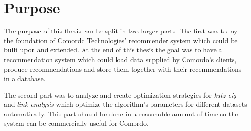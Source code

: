 
\section{Purpose}\label{sec:intro:purpose}

The purpose of this thesis can be split in two larger parts. The first was to lay the foundation of Comordo Technologies' recommender system which could be built upon and extended. At the end of this thesis the goal was to have a recommendation system which could load data supplied by Comordo's clients, produce recommendations and store them together with their recommendations in a database.

The second part was to analyze and create optimization strategies for \textit{katz-eig} and \textit{link-analysis} which optimize the algorithm's parameters for different datasets automatically. This part should be done in a reasonable amount of time so the system can be commercially useful for Comordo.



